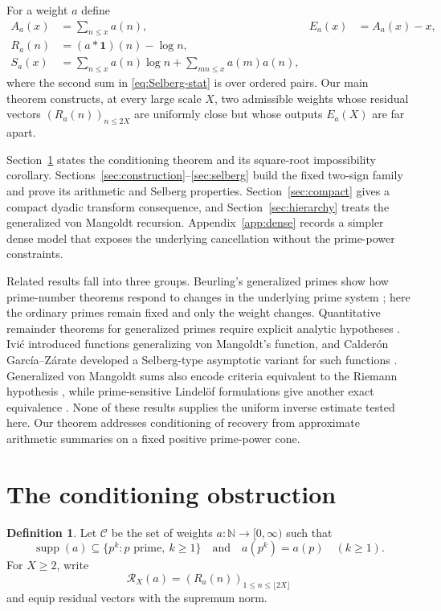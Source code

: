 \documentclass[11pt,a4paper]{amsart}
\theoremstyle{definition}
\newtheorem{definition}[theorem]{Definition}
\DeclareMathOperator{\suppop}{supp}
\newcommand{\N}{\mathbb N}
\newcommand{\1}{\mathbf 1}
\begin{document}
For a weight $a$ define
\begin{align}
 A_a(x)&=\sum_{n\le x}a(n),
 &E_a(x)&=A_a(x)-x,\label{eq:A-E}\\
 R_a(n)&=(a*\1)(n)-\log n,\label{eq:residual}\\
 S_a(x)&=\sum_{n\le x}a(n)\log n
       +\sum_{mn\le x}a(m)a(n),\label{eq:Selberg-stat}
\end{align}
where the second sum in \eqref{eq:Selberg-stat} is over ordered pairs.  Our main theorem constructs, at every large scale $X$, two admissible weights whose residual vectors $(R_a(n))_{n\le2X}$ are uniformly close but whose outputs $E_a(X)$ are far apart.

Section~\ref{sec:main} states the conditioning theorem and its square-root impossibility corollary.  Sections~\ref{sec:construction}--\ref{sec:selberg} build the fixed two-sign family and prove its arithmetic and Selberg properties.  Section~\ref{sec:compact} gives a compact dyadic transform consequence, and Section~\ref{sec:hierarchy} treats the generalized von Mangoldt recursion.  Appendix~\ref{app:dense} records a simpler dense model that exposes the underlying cancellation without the prime-power constraints.

Related results fall into three groups.  Beurling's generalized primes show how prime-number theorems respond to changes in the underlying prime system \cite{Beurling1937}; here the ordinary primes remain fixed and only the weight changes.  Quantitative remainder theorems for generalized primes require explicit analytic hypotheses \cite{DebruyneVindas2017}.  Ivi\'c introduced functions generalizing von Mangoldt's function, and Calder\'on Garc\'ia--Z\'arate developed a Selberg-type asymptotic variant for such functions \cite{Ivic1975,CalderonGarciaZarate1990}.  Generalized von Mangoldt sums also encode criteria equivalent to the Riemann hypothesis \cite{Balazard2008,BanksSinha2025}, while prime-sensitive Lindel\"of formulations give another exact equivalence \cite{GonekGrahamLee2020}.  None of these results supplies the uniform inverse estimate tested here.  Our theorem addresses conditioning of recovery from approximate arithmetic summaries on a fixed positive prime-power cone.

\section{The conditioning obstruction}\label{sec:main}

\begin{definition}\label{def:cone}
Let $\mathcal C$ be the set of weights $a:\N\to[0,\infty)$ such that
\[
  \suppop(a)\subseteq\{p^k:p\text{ prime},\ k\ge1\}
  \quad\text{and}\quad
  a(p^k)=a(p)\quad(k\ge1).
\]
For $X\ge2$, write
\[
  \mathcal R_X(a)=(R_a(n))_{1\le n\le\lfloor2X\rfloor}
\]
and equip residual vectors with the supremum norm.
\end{definition}
\end{document}
